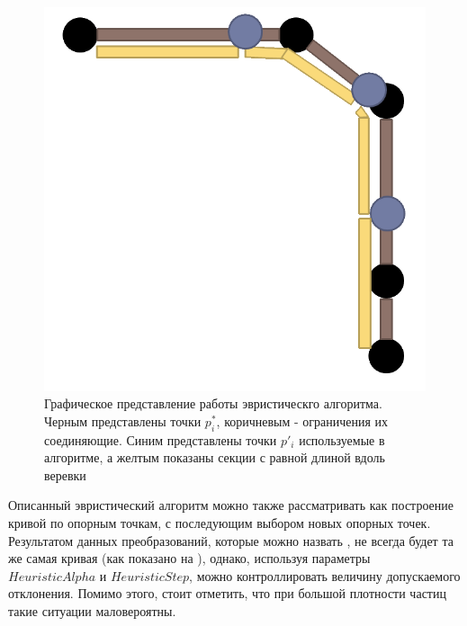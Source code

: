 	\begin{figure}[ht!] 
		\center
		\includegraphics [scale=0.35] {my_folder/images//heuristicSchema}
		\caption{Графическое представление работы эвристическго алгоритма. Черным представлены точки $p^*_i$, коричневым - ограничения их соединяющие. Синим представлены точки $p'_i$ используемые в алгоритме, а желтым показаны секции с равной длиной вдоль веревки}
		\label{fig:heuristicSchema}  
	\end{figure}	
	\FloatBarrier 
	
	Описанный эвристический алгоритм можно также рассматривать как построение кривой по опорным точкам, с последующим выбором новых опорных точек. Результатом данных преобразований, которые можно назвать , не всегда будет та же самая кривая (как показано на ), однако, используя параметры $HeuristicAlpha$ и $HeuristicStep$, можно контроллировать величину допускаемого отклонения. Помимо этого, стоит отметить, что при большой плотности частиц такие ситуации маловероятны.
	
